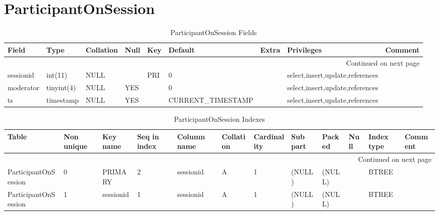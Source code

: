 \documentclass[tablesignature,landscape]{scrartcl}
\begin{document}
\section{ParticipantOnSession}
\label{sec-9}


\begin{longtable}{|l|l|l|l|l|l|l|l|l|}
\caption{ParticipantOnSession Fields} \label{tbl:participantonsessionfields}\\
\hline
 Field      &  Type         &  Collation                &  Null  &  Key  &               Default  &  Extra  &  Privileges                       &  Comment \\
\hline
\endhead
\hline\multicolumn{9}{r}{Continued on next page}\
\endfoot
\endlastfoot
\hline
 badgeid    &  varchar(15)  &  latin1\_{}swedish\_{}ci  &        &  PRI  &                        &         &  select,insert,update,references  &           \\
 sessionid  &  int(11)      &  NULL                     &        &  PRI  &                     0  &         &  select,insert,update,references  &           \\
 moderator  &  tinyint(4)   &  NULL                     &  YES   &       &                     0  &         &  select,insert,update,references  &           \\
 ts         &  timestamp    &  NULL                     &  YES   &       &  CURRENT\_{}TIMESTAMP  &         &  select,insert,update,references  &           \\
\hline
\end{longtable}


\begin{longtable}{|l|l|l|l|l|l|l|l|l|l|l|l|}
\caption{ParticipantOnSession Indexes} \label{tbl:participantonsessionindexes}\\
\hline
 Table                 &  Non unique  &  Key name   &  Seq in index  &  Column name  &  Collation  &  Cardinality  &  Sub part  &  Packed  &  Null  &  Index type  &  Comment \\
\hline
\endhead
\hline\multicolumn{12}{r}{Continued on next page}\
\endfoot
\endlastfoot
\hline
 ParticipantOnSession  &           0  &  PRIMARY    &             1  &  badgeid      &  A          &            1  &  (NULL)    &  (NULL)  &        &  BTREE       &           \\
 ParticipantOnSession  &           0  &  PRIMARY    &             2  &  sessionid    &  A          &            1  &  (NULL)    &  (NULL)  &        &  BTREE       &           \\
 ParticipantOnSession  &           1  &  sessionid  &             1  &  sessionid    &  A          &            1  &  (NULL)    &  (NULL)  &        &  BTREE       &           \\
\hline
\end{longtable}
\end{document}
